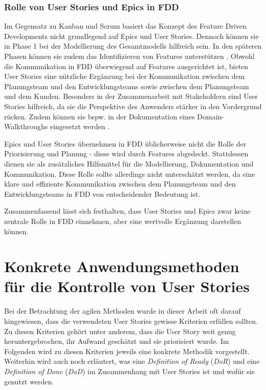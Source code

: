 \documentclass[acmtog]{acmart}
\begin{document}
\subsubsection{Rolle von User Stories und Epics in FDD}

Im Gegensatz zu Kanban und Scrum basiert das Konzept des Feature Driven Developments nicht grundlegend auf Epics und User Stories.
Dennoch können sie in Phase 1 bei der Modellierung des Gesamtmodells hilfreich sein.
In den späteren Phasen können sie zudem das Identifizieren von Features unterstützen \cite{hunt06}.
Obwohl die Kommunikation in FDD überwiegend auf Features ausgerichtet ist, bieten User Stories eine nützliche Ergänzung bei der Kommunikation zwischen dem Planungsteam und den Entwicklungsteams sowie zwischen dem Planungsteam und dem Kunden.
Besonders in der Zusammenarbeit mit Stakeholdern sind User Stories hilfreich, da sie die Perspektive des Anwenders stärker in den Vordergrund rücken.
Zudem können sie bspw. in der Dokumentation eines Domain-Walkthroughs eingesetzt werden \cite{palmer02}.

Epics und User Stories übernehmen in FDD üblicherweise nicht die Rolle der Priorisierung und Planung - diese wird durch Features abgedeckt. Stattdessen dienen sie als zusätzliches Hilfsmittel für die Modellierung, Dokumentation und Kommunikation. Diese Rolle sollte allerdings nicht unterschätzt werden, da eine klare und effiziente Kommunikation zwischen dem Planungsteam und den Entwicklungsteams in FDD von entscheidender Bedeutung ist.

Zusammenfassend lässt sich festhalten, dass User Stories und Epics zwar keine zentrale Rolle in FDD einnehmen, aber eine wertvolle Ergänzung darstellen können.

\section{Konkrete Anwendungsmethoden für die Kontrolle von User Stories} \label{sec:konkrete-anwendungsmethoden}

Bei der Betrachtung der agilen Methoden wurde in dieser Arbeit oft darauf hingewiesen, dass die verwendeten User Stories gewisse Kriterien
erfüllen sollten. Zu diesen Kriterien gehört unter anderem, dass die User Story weit genug heruntergebrochen, ihr Aufwand geschätzt und sie priorisiert
wurde. Im Folgenden wird zu diesen Kriterien jeweils eine konkrete Methodik vorgestellt. Weiterhin wird auch noch erläutert, was eine \emph{Definition of
	Ready} (\emph{DoR}) und eine \emph{Definition of Done} (\emph{DoD}) im Zusammenhang mit User Stories ist und wofür sie genutzt werden.
\end{document}
